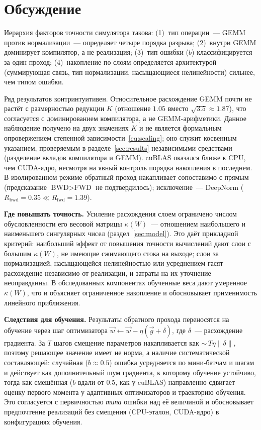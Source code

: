 \section{Обсуждение}
\label{sec:discussion}

Иерархия факторов точности симулятора такова: (1)~тип операции~--- GEMM против
нормализации~--- определяет четыре порядка разрыва; (2)~внутри GEMM доминирует
компилятор, а не реализация; (3)~тип ошибки ($b$) классифицируется за один
проход; (4)~накопление по слоям определяется архитектурой (суммирующая связь,
тип нормализации, насыщающиеся нелинейности) сильнее, чем типом ошибки.

Ряд результатов контринтуитивен. Относительное расхождение GEMM почти не растёт с
размерностью редукции $K$ (отношение $1.05$ вместо $\sqrt{3.5}\approx1.87$),
что согласуется с доминированием компилятора, а не GEMM-арифметики. Данное
наблюдение получено на двух значениях $K$ и не является формальным опровержением
степенной зависимости~\eqref{eq:scaling}; оно служит косвенным указанием,
проверяемым в разделе~\ref{sec:results} независимыми средствами (разделение
вкладов компилятора и GEMM). cuBLAS оказался ближе к CPU, чем CUDA-ядро, несмотря
на явный контроль порядка накопления в последнем. В изолированном режиме обратный
проход накапливает сопоставимо с прямым (предсказание $\text{BWD}>\text{FWD}$ не
подтвердилось); исключение~--- DeepNorm
($R_{\text{bwd}}=0.35\ll R_{\text{fwd}}=1.39$).

\textbf{Где повышать точность.} Усиление расхождения слоем ограничено числом
обусловленности его весовой матрицы $\kappa(W)$~--- отношением наибольшего и
наименьшего сингулярных чисел (раздел~\ref{sec:model}). Это даёт прикладной
критерий: наибольший эффект от повышения точности вычислений дают слои с большим
$\kappa(W)$, не имеющие сжимающего стока на выходе; слои за нормализацией,
насыщающейся нелинейностью или усреднением гасят расхождение независимо от
реализации, и затраты на их уточнение неоправданны. В обследованных компонентах
обученные веса дают умеренное $\kappa(W)$, что и объясняет ограниченное
накопление и обосновывает применимость линейного приближения.

\textbf{Следствия для обучения.} Результаты обратного прохода переносятся на
обучение через шаг оптимизатора $\Vec{w}\leftarrow\Vec{w}-\eta(\Vec{g}+\delta)$,
где $\delta$~--- расхождение градиента. За $T$ шагов смещение параметров
накапливается как ${\sim}\,T\eta\|\delta\|$, поэтому решающее значение имеет не
норма, а наличие систематической составляющей: случайная ($b\approx0.5$) ошибка
усредняется по мини-батчам и шагам и действует как дополнительный шум градиента,
к которому обучение устойчиво, тогда как смещённая ($b$ вдали от $0.5$, как у
cuBLAS) направленно сдвигает оценку первого момента у адаптивных оптимизаторов и
траекторию обучения. Это согласуется с первичностью \emph{типа} ошибки над её
величиной и обосновывает предпочтение реализаций без смещения (CPU-эталон,
CUDA-ядро) в конфигурациях обучения.

